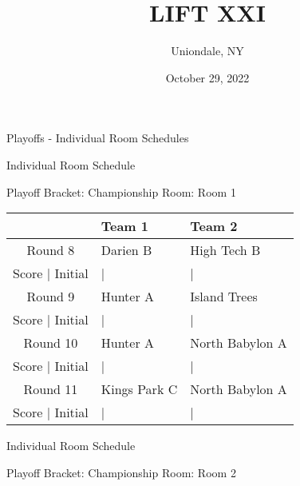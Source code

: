 \documentclass{article}%
\title{LIFT XXI}%
\author{Uniondale, NY}%
\date{October 29, 2022}%
\begin{document}
%
\normalsize%
%
\maketitle%
\vspace*{48pt}%
\begin{center}%
\begin{Huge}%
Playoffs {-} Individual Room Schedules%
\end{Huge}%
\end{center}%
\newpage%
\pagestyle{fancy}%
\fancyhf{}%
%
%
%
\begin{center}%
\begin{Huge}%
Individual Room Schedule%
\end{Huge}%
\vspace*{16pt}%
\linebreak%
\begin{Large}%
Playoff Bracket: Championship \hfill Room: Room 1%
\end{Large}%
\end{center}%
%
\begin{tabularx}{\textwidth}{|c|Y|Y|}%
\hline%
&Team 1&Team 2\\%
\hline%
Round 8&Darien B&High Tech B\\%
\hline%
Score | Initial&|&|\\%
\hline%
Round 9&Hunter A&Island Trees\\%
\hline%
Score | Initial&|&|\\%
\hline%
Round 10&Hunter A&North Babylon A\\%
\hline%
Score | Initial&|&|\\%
\hline%
Round 11&Kings Park C&North Babylon A\\%
\hline%
Score | Initial&|&|\\%
\hline%
\end{tabularx}%
\vspace*{16pt}%
\linebreak%
\newpage%
\begin{center}%
\begin{Huge}%
Individual Room Schedule%
\end{Huge}%
\vspace*{16pt}%
\linebreak%
\begin{Large}%
Playoff Bracket: Championship \hfill Room: Room 2%
\end{Large}%
\end{center}%
\end{document}
